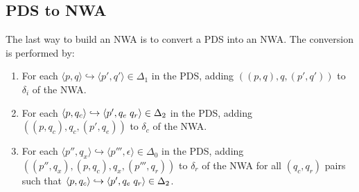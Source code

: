 \documentclass{llncs}
\begin{document}
\subsection{PDS to NWA}
\label{Se:PDStoNWA}

The last way to build an NWA is to convert a PDS into an NWA.  The conversion is performed by:

\begin{enumerate}

\item For each $\langle p,q \rangle \hookrightarrow \langle p',q' \rangle \in \Delta_1$ in the PDS, adding $( (p,q), q, (p',q') )$ to $\delta_i$ of the NWA.

\item For each $\langle p,q_c \rangle \hookrightarrow \langle p',q_e \hspace{.1cm} q_r \rangle \in \Delta_2$ in the PDS, adding $( (p,q_c), q_c, (p',q_e) )$ to $\delta_c$ of the NWA.

\item For each $\langle p'',q_x \rangle \hookrightarrow \langle p''',\epsilon \rangle \in \Delta_0$ in the PDS, adding $( (p'',q_x), (p,q_c), q_x, (p''',q_r) )$ to $\delta_r$ of the NWA for all $(q_c,q_r)$ pairs such that $\langle p,q_c \rangle \hookrightarrow \langle p',q_e \hspace{.1cm} q_r \rangle \in \Delta_2$. 

\end{enumerate}
\end{document}
